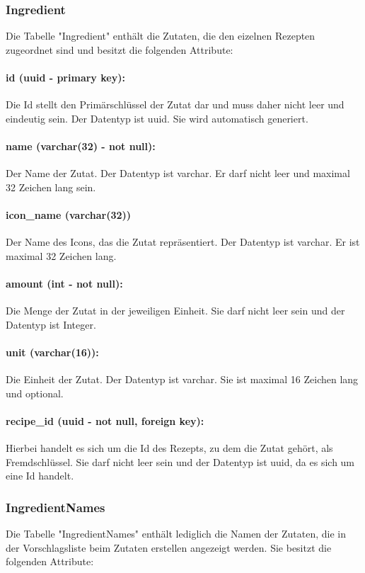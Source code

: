 \documentclass[parskip=full]{scrartcl}
\begin{document}
\subsubsection{Ingredient}
Die Tabelle "Ingredient" enthält die Zutaten, die den eizelnen Rezepten zugeordnet sind und besitzt die folgenden Attribute:
\paragraph{id (uuid - primary key):} Die Id stellt den Primärschlüssel der Zutat dar und muss daher nicht leer und eindeutig sein. Der Datentyp ist \Gls{uuid}. Sie wird automatisch generiert. 
\paragraph{name (varchar(32) - not null):} Der Name der Zutat. Der Datentyp ist \Gls{varchar}. Er darf nicht leer und maximal 32 Zeichen lang sein.
\paragraph{icon\_name (varchar(32))} Der Name des Icons, das die Zutat repräsentiert. Der Datentyp ist \Gls{varchar}. Er ist maximal 32 Zeichen lang.
\paragraph{amount (int - not null):} Die Menge der Zutat in der jeweiligen Einheit. Sie darf nicht leer sein und der Datentyp ist Integer.
\paragraph{unit (varchar(16)):} Die Einheit der Zutat. Der Datentyp ist \Gls{varchar}. Sie ist maximal 16 Zeichen lang und optional. 
\paragraph{recipe\_id (uuid - not null, foreign key):} Hierbei handelt es sich um die Id des Rezepts, zu dem die Zutat gehört, als Fremdschlüssel. Sie darf nicht leer sein und der Datentyp ist \Gls{uuid}, da es sich um eine Id handelt.
\newpage
\subsubsection{IngredientNames}
Die Tabelle "IngredientNames" enthält lediglich die Namen der Zutaten, die in der Vorschlagsliste beim Zutaten erstellen angezeigt werden. Sie besitzt die folgenden Attribute:
\end{document}
